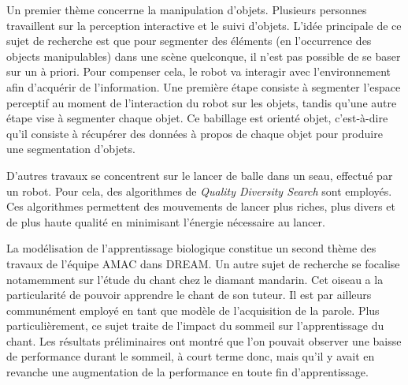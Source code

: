 \documentclass{llncs}
\begin{document}
Un premier thème concerrne la manipulation d'objets.
Plusieurs personnes travaillent sur la perception interactive et le suivi d'objets.
L'idée principale de ce sujet de recherche est que pour segmenter des éléments (en l'occurrence des objects manipulables) dans une scène quelconque, il n'est pas possible de se baser sur un à priori.
Pour compenser cela, le robot va interagir avec l'environnement afin d'acquérir de l'information.
Une première étape consiste à segmenter l'espace perceptif au moment de l'interaction du robot sur les objets, tandis qu'une autre étape vise à segmenter chaque objet.
Ce babillage est orienté objet, c'est-à-dire qu'il consiste à récupérer des données à propos de chaque objet pour produire une segmentation d'objets.



D'autres travaux se concentrent sur le lancer de balle dans un seau, effectué par un robot.
Pour cela, des algorithmes de \textit{Quality Diversity Search} sont employés.
Ces algorithmes permettent des mouvements de lancer plus riches, plus divers et de plus haute qualité en minimisant l'énergie nécessaire au lancer.

La modélisation de l'apprentissage biologique constitue un second thème des travaux de l'équipe AMAC dans DREAM.
Un autre sujet de recherche se focalise notamemment sur l'étude du chant chez le diamant mandarin.
Cet oiseau a la particularité de pouvoir apprendre le chant de son tuteur.
Il est par ailleurs communément employé en tant que modèle de l'acquisition de la parole.
Plus particulièrement, ce sujet traite de l'impact du sommeil sur l'apprentissage du chant.
Les résultats préliminaires ont montré que l'on pouvait observer une baisse de performance durant le sommeil, à court terme donc, mais qu'il y avait en revanche une  augmentation de la performance en toute fin d'apprentissage.
\end{document}
